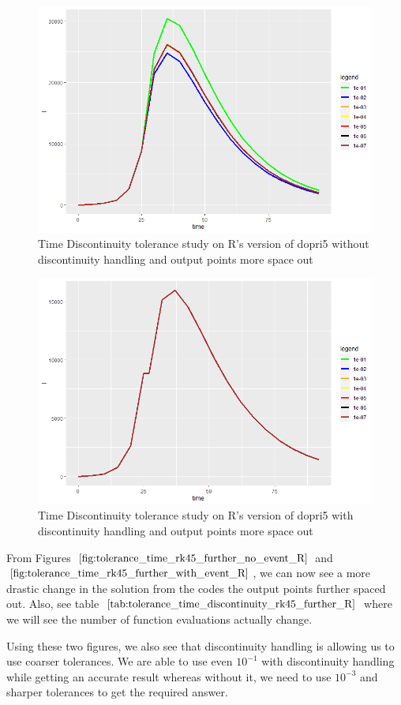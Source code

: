 \begin{figure}[h]
	\centering
	\includegraphics[width=0.7\linewidth]{./figures/tolerance_time_rk45_further_no_event_R}
	\caption{Time Discontinuity tolerance study on R's version of dopri5 without discontinuity handling and output points more space out}
	\label{fig:tolerance_time_rk45_further_no_event_R}
\end{figure}

\begin{figure}[h]
	\centering
	\includegraphics[width=0.7\linewidth]{./figures/tolerance_time_rk45_further_with_event_R}
	\caption{Time Discontinuity tolerance study on R's version of dopri5 with discontinuity handling and output points more space out}
	\label{fig:tolerance_time_rk45_further_with_event_R}
\end{figure}

From Figures $\ref{fig:tolerance_time_rk45_further_no_event_R}$ and $\ref{fig:tolerance_time_rk45_further_with_event_R}$, we can now see a more drastic change in the solution from the codes the output points further spaced out. Also, see table $\ref{tab:tolerance_time_discontinuity_rk45_further_R}$ where we will see the number of function evaluations actually change.

Using these two figures, we also see that discontinuity handling is allowing us to use coarser tolerances. We are able to use even $10^{-1}$ with discontinuity handling while getting an accurate result whereas without it, we need to use $10^{-3}$ and sharper tolerances to get the required answer.


